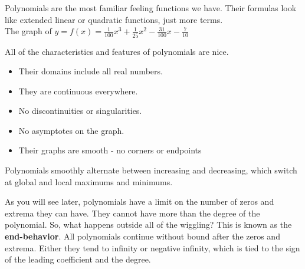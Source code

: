 \documentclass{ximera}
\begin{document}
Polynomials are the most familiar feeling functions we have. Their formulas look like extended linear or quadratic functions, just more terms.\\

The graph of $y = f(x) = \frac{1}{100} x^3 + \frac{1}{25} x^2 - \frac{31}{100} x - \frac{7}{10}$

\begin{image}
\end{image}



All of the characteristics and features of polynomials are nice.

\begin{itemize}
\item Their domains include all real numbers. 
\item They are continuous everywhere.
\item No discontinuities or singularities.
\item No asymptotes on the graph.
\item Their graphs are smooth - no corners or endpoints
\end{itemize}


Polynomials smoothly alternate between increasing and decreasing, which switch at global and local maximums and minimums.

As you will see later, polynomials have a limit on the number of zeros and extrema they can have.  They cannot have more than the degree of the polynomial. So, what happens outside all of the wiggling?  This is known as the \textbf{end-behavior}.  All polynomials continue without bound after the zeros and extrema.  Either they tend to infinity or negative infinity, which is tied to the sign of the leading coefficient and the degree.
\end{document}
